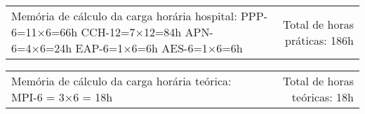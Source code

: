 {\fontsize{10pt}{12pt}\selectfont
\noindent
\begin{tabularx}{\linewidth}{@{}X r@{}}
Memória de cálculo da carga horária hospital:
PPP-6=11×6=66h
CCH-12=7×12=84h
APN-6=4×6=24h
EAP-6=1×6=6h
AES-6=1×6=6h &
Total de horas práticas: 186h\\
\end{tabularx}
\noindent
\begin{tabularx}{\linewidth}{@{}X r@{}}
Memória de cálculo da carga horária teórica: 
MPI-6 = 3×6 = 18h &
Total de horas teóricas: 18h
\end{tabularx}
}